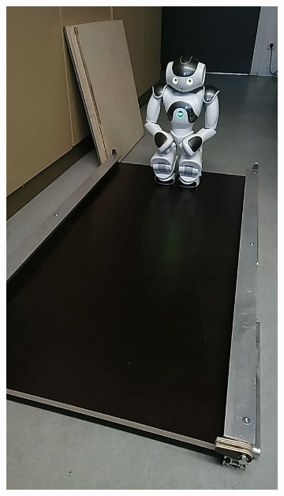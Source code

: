 \begin{figure}[tb]
	\hfill
	\begin{subfigure}[c]{0.4\linewidth}
		\centering
		\includegraphics[width=\linewidth]{Bilder/NAO_auf_Rampe2.jpg}
	\end{subfigure}
	\hfill
	\begin{subfigure}[c]{0.4315\linewidth}
		\centering

\end{subfigure}
\end{figure}
